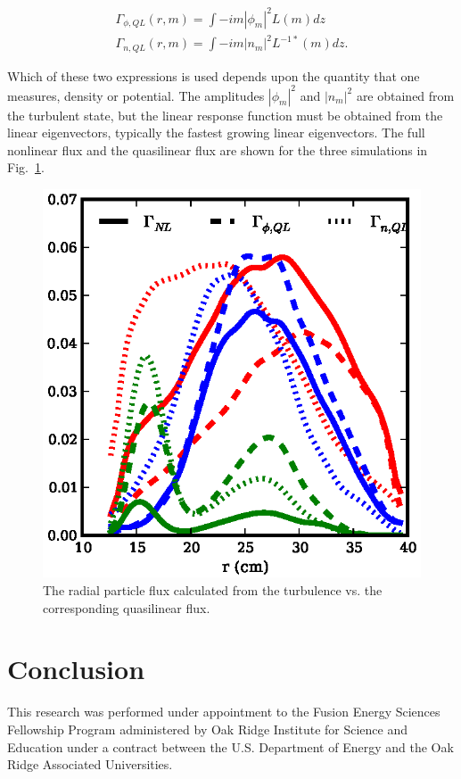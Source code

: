 \documentclass[showpacs,preprintnumbers,amsmath,amssymb,superscriptaddress,aip]{revtex4-1}
\def\beqar{\begin{eqnarray}}
\def\eeqar{\end{eqnarray}}
\begin{document}
\beqar
\label{ql_flux_phi}
\Gamma_{\phi,QL}(r,m) = \int - i m |\phi_m|^2 L(m) dz \\
\label{ql_flux_ni}
\Gamma_{n,QL}(r,m) = \int - i m |n_m|^2 L^{-1 *}(m) dz.
\eeqar

Which of these two expressions is used depends upon the quantity that one measures, density or potential.
The amplitudes $|\phi_m|^2$ and $|n_m|^2$ are obtained from the turbulent state, but the linear response function must be obtained from the linear eigenvectors, typically the fastest growing
linear eigenvectors. The full nonlinear flux and the quasilinear flux are shown for the three simulations in Fig.~\ref{flux_comparison}.

\begin{figure}[!htbp]
\includegraphics[]{flux_comparison}
\hfil
\caption{The radial particle flux calculated from the turbulence vs. the corresponding quasilinear flux.}
\label{flux_comparison}
\end{figure}


\section{Conclusion}
\label{conclusion}

\begin{acknowledgments}
This research was performed under appointment to the Fusion Energy Sciences Fellowship Program administered by Oak Ridge Institute for
Science and Education under a contract between the U.S. Department of Energy and the Oak Ridge Associated Universities. 
\end{acknowledgments}
\end{document}
